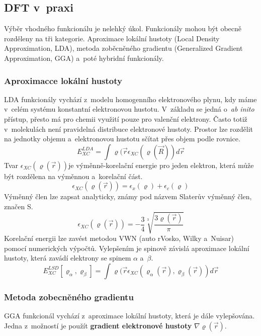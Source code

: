\documentclass[
  printed, %
  table,   %
  lof,     %
  lot,     %
  oneside,
]{fithesis3}
\begin{document}
\subsection{DFT v~praxi}
Výběr vhodného funkcionálu je nelehký úkol. Funkcionály mohou být obecně rozděleny na tři kategorie. Aproximace lokální hustoty (Local Density Approximation, LDA), metoda zoběcněného gradientu (Generalized Gradient Approximation, GGA) a~poté hybridní funkcionály. \cite{dftshrnutivysledky}
\subsubsection{Aproximacce lokální hustoty}
LDA funkcionály vychází z~modelu homogenního elektronového plynu, kdy máme v~celém systému konstantní elektronovou hustotu.\cite{dftshrnutivysledky} V~základu se jedná o~\textit{ab inito} přístup, přesto má pro chemii využití pouze pro valenční elektrony. Často totiž v~molekulách není pravidelná distribuce elektronové hustoty. Prostor lze rozdělit na jednotky objemu a~elektronovou hustotu sčítat přes objem podle rovnice.
\begin{equation}
E_{XC}^{LDA} = \int \varrho (\vec{r} \epsilon_{XC} (\varrho (\vec{R})) d \vec{r}
\label{LDA_vyraz_pro_obecnou_energii}
\end{equation}
Tvar $\epsilon_{XC}(\varrho (\vec{r}))$je výměnně-korelační energie pro jeden elektron, která může být rozdělena na výměnnou a~korelační část. 
\begin{equation}
\epsilon_{XC}(\varrho (\vec{r})) = \epsilon_x (\varrho) + \epsilon_c (\varrho)
\label{LDA_tvar_vymene_korelacni_energie}
\end{equation}
Výměnný člen lze zapsat analyticky, známy pod názvem Slaterův výměnný člen, značen S.
\begin{equation}
\epsilon_{XC}(\varrho (\vec{r})) = - \frac{3}{4} \sqrt[3]{\frac{3 \varrho (\vec{r})}{\pi}}
\label{LDA_vymenny_clen}
\end{equation}
Korelační energii lze zavést metodou VWN (auto rVosko, Wilky a~Nuisar) pomocí numerických výpočtů. Vylepšením je spinově závislá aproximace lokální hustoty, která zavádí elektrony se spinem $\alpha$ a~$\beta$.
\begin{equation}
E_{XC}^{LSD}[\varrho_{\alpha}, \varrho_{\beta}] = \int \varrho (\vec{r} \epsilon_{XC}( \varrho_{\alpha}(\vec{r}), \varrho_{\beta}(\vec{r})) d \vec{r}
\end{equation}
\cite{koch2000chemist}
\subsubsection{Metoda zobecněného gradientu}
GGA funkcionál vychází z~aproximace lokální hustoty, která je dále vylepšována. Jedna z~možností je použít \textbf{gradient elektronové hustoty} $\nabla \varrho (\vec{r})$.  \cite{koch2000chemist}
\end{document}

